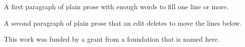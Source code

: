 \documentclass{article}
\begin{document}
A first paragraph of plain prose with enough words to fill one line or more.

A second paragraph of plain prose that an edit deletes to move the lines below.

\begin{acks}
This work was funded by a grant from a foundation that is named here.
\end{acks}
\end{document}
